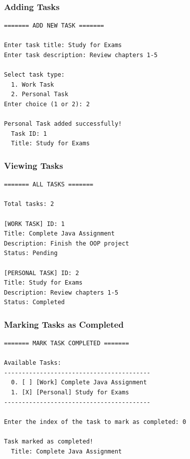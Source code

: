 \documentclass[12pt,a4paper]{article}
\begin{document}
\subsubsection{Adding Tasks}

\begin{minipage}{\linewidth}
\begin{verbatim}
======= ADD NEW TASK =======

Enter task title: Study for Exams
Enter task description: Review chapters 1-5

Select task type:
  1. Work Task
  2. Personal Task
Enter choice (1 or 2): 2

Personal Task added successfully!
  Task ID: 1
  Title: Study for Exams
\end{verbatim}
\end{minipage}

\subsubsection{Viewing Tasks}

\begin{minipage}{\linewidth}
\begin{verbatim}
======= ALL TASKS =======

Total tasks: 2

[WORK TASK] ID: 1
Title: Complete Java Assignment
Description: Finish the OOP project
Status: Pending

[PERSONAL TASK] ID: 2
Title: Study for Exams
Description: Review chapters 1-5
Status: Completed
\end{verbatim}
\end{minipage}

\subsubsection{Marking Tasks as Completed}

\begin{minipage}{\linewidth}
\begin{verbatim}
======= MARK TASK COMPLETED =======

Available Tasks:
-----------------------------------------
  0. [ ] [Work] Complete Java Assignment
  1. [X] [Personal] Study for Exams
-----------------------------------------

Enter the index of the task to mark as completed: 0

Task marked as completed!
  Title: Complete Java Assignment
\end{verbatim}
\end{minipage}
\end{document}
